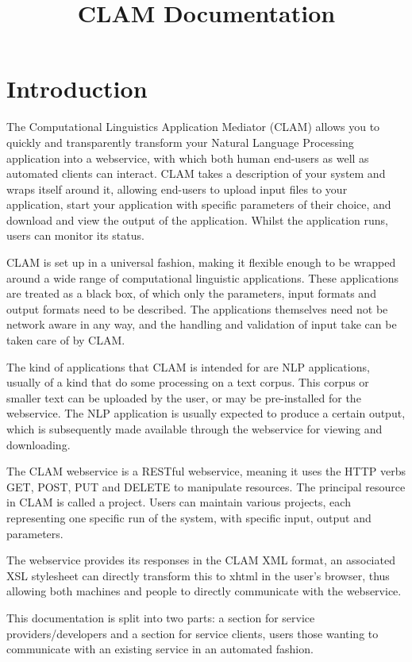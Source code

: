 \title{CLAM Documentation}




\chapter{Introduction} 

The Computational Linguistics Application Mediator (CLAM) allows you to quickly and transparently transform your Natural Language Processing application into a webservice, with which both human end-users as well as automated clients can interact. CLAM takes a description of your system and wraps itself around it, allowing end-users to upload input files to your application, start your application with specific parameters of their choice, and download and view the output of the application. Whilst the application runs, users can monitor its status.

CLAM is set up in a universal fashion, making it flexible enough to be wrapped around a wide range of computational linguistic applications. These applications are treated as a black box, of which only the parameters, input formats and output formats need to be described. The applications themselves need not be network aware in any way, and the handling and validation of input take can be taken care of by CLAM.

The kind of applications that CLAM is intended for are NLP applications, usually of a kind that do some processing on a text corpus. This corpus or smaller text can be uploaded by the user, or may be pre-installed for the webservice. The NLP application is usually expected to produce a certain output, which is subsequently made available through the webservice for viewing and downloading.

The CLAM webservice is a RESTful webservice, meaning it uses the HTTP verbs GET, POST, PUT and DELETE to manipulate resources. The principal resource in CLAM is called a project. Users can maintain various projects, each representing one specific run of the system, with specific input, output and parameters.

The webservice provides its responses in the CLAM XML format, an associated XSL stylesheet can directly transform this to xhtml in the user's browser, thus allowing both machines and people to directly communicate with the webservice.

This documentation is split into two parts: a section for service providers/developers and a section for service clients, users those wanting to communicate with an existing service in an automated fashion.

